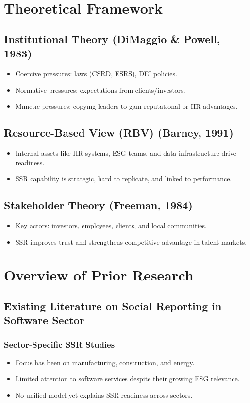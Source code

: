 \section{Theoretical Framework}
\subsection{Institutional Theory (DiMaggio \& Powell, 1983)}
\begin{itemize}
    \item Coercive pressures: laws (CSRD, ESRS), DEI policies.
    \item Normative pressures: expectations from clients/investors.
    \item Mimetic pressures: copying leaders to gain reputational or HR advantages.
\end{itemize}

\subsection{Resource-Based View (RBV) (Barney, 1991)}
\begin{itemize}
    \item Internal assets like HR systems, ESG teams, and data infrastructure drive readiness.
    \item SSR capability is strategic, hard to replicate, and linked to performance.
\end{itemize}

\subsection{Stakeholder Theory (Freeman, 1984)}
\begin{itemize}
    \item Key actors: investors, employees, clients, and local communities.
    \item SSR improves trust and strengthens competitive advantage in talent markets.
\end{itemize}

\section{Overview of Prior Research}

\subsection{Existing Literature on Social Reporting in Software Sector}
\subsubsection{Sector-Specific SSR Studies}
\begin{itemize}
    \item Focus has been on manufacturing, construction, and energy.
    \item Limited attention to software services despite their growing ESG relevance.
    \item No unified model yet explains SSR readiness across sectors.
\end{itemize}

